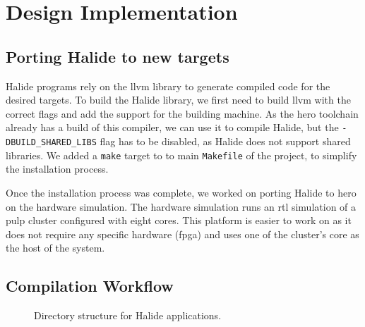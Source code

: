 

\chapter{Design Implementation}


\section { Porting Halide to new targets}
    Halide programs rely on the \gls{llvm} library to generate compiled code for the desired targets. To build the Halide library, we first need to build \gls{llvm} with the correct flags and add the support for the building machine.
    As the \gls{hero} toolchain already has a build of this compiler, we can use it to compile Halide, but the \texttt{-DBUILD\_SHARED\_LIBS} flag has to be disabled, as Halide does not support shared libraries.
    We added a \texttt{make} target to to main \texttt{Makefile} of the project, to simplify the installation process.

    Once the installation process was complete, we worked on porting Halide to \gls{hero} on the hardware simulation.
    The hardware simulation runs an \gls{rtl} simulation of a \gls{pulp} cluster configured with eight cores. This platform is easier to work on as it does not require any specific hardware (\gls{fpga}) and uses one of the cluster's core as the host of the system.

    \section{Compilation Workflow}

\begin{figure}[H]
    \caption{Directory structure for Halide applications.}
    \label{Fig:DirectoryStructure}
\end{figure}



